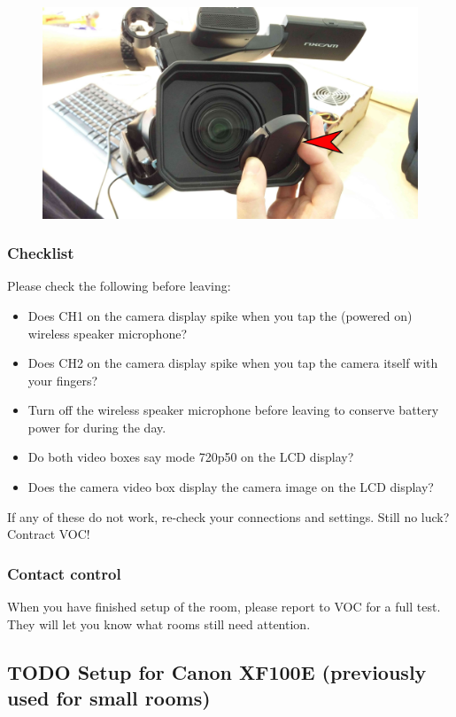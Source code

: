 \documentclass{article}
\begin{document}
\begin{figure}[H]
  \centering
\includegraphics[width = 120mm]{Sony07.jpg}
\end{figure}

\subsubsection{Checklist}
Please check the following before leaving:
\begin{itemize}
  \item Does CH1 on the camera display spike when you tap the (powered on) wireless speaker microphone?
  \item Does CH2 on the camera display spike when you tap the camera itself with your fingers?
  \item Turn off the wireless speaker microphone before leaving to conserve battery power for during the day.
  \item Do both video boxes say mode 720p50 on the LCD display?
  \item Does the camera video box display the camera image on the LCD display?
\end{itemize}

If any of these do not work, re-check your connections and settings. Still no luck? Contract VOC!

\subsubsection{Contact control}
When you have finished setup of the room, please report to VOC for a full test.
They will let you know what rooms still need attention.

\subsection{TODO Setup for Canon XF100E (previously used for small rooms)}
\end{document}
